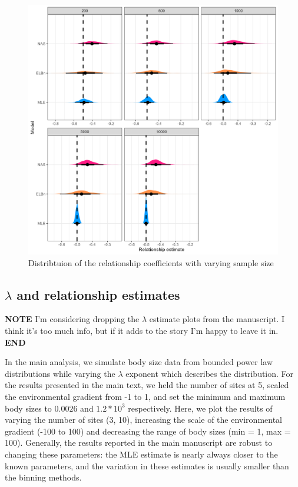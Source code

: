 \documentclass[
]{article}
\begin{document}
\newpage

\begin{figure}
\centering
\includegraphics{figures/n_vary_relationship_density.png}
\caption{Distribtuion of the relationship coefficients with varying
sample size}
\end{figure}

\newpage

\hypertarget{lambda-and-relationship-estimates}{%
\subsection{\texorpdfstring{\(\lambda\) and relationship
estimates}{\textbackslash lambda and relationship estimates}}\label{lambda-and-relationship-estimates}}

\textbf{NOTE} I'm considering dropping the \(\lambda\) estimate plots
from the manuscript. I think it's too much info, but if it adds to the
story I'm happy to leave it in. \textbf{END}

In the main analysis, we simulate body size data from bounded power law
distributions while varying the \(\lambda\) exponent which describes the
distribution. For the results presented in the main text, we held the
number of sites at 5, scaled the environmental gradient from -1 to 1,
and set the minimum and maximum body sizes to \(0.0026\) and
\(1.2 *10^3\) respectively. Here, we plot the results of varying the
number of sites (3, 10), increasing the scale of the environmental
gradient (-100 to 100) and decreasing the range of body sizes (min = 1,
max = 100). Generally, the results reported in the main manuscript are
robust to changing these parameters: the MLE estimate is nearly always
closer to the known parameters, and the variation in these estimates is
usually smaller than the binning methods.
\end{document}
